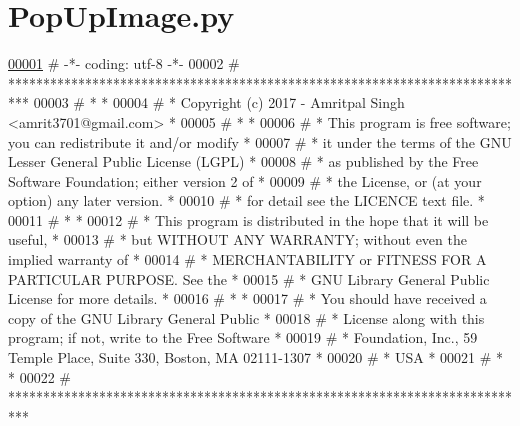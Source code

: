 \hypertarget{PopUpImage_8py_source}{}\section{Pop\+Up\+Image.\+py}

\begin{DoxyCode}
\hypertarget{PopUpImage_8py_source.tex_l00001}{}\hyperlink{namespacePopUpImage}{00001} \textcolor{comment}{# -*- coding: utf-8 -*-}
00002 \textcolor{comment}{# ***************************************************************************}
00003 \textcolor{comment}{# *                                                                         *}
00004 \textcolor{comment}{# *   Copyright (c) 2017 - Amritpal Singh <amrit3701@gmail.com>             *}
00005 \textcolor{comment}{# *                                                                         *}
00006 \textcolor{comment}{# *   This program is free software; you can redistribute it and/or modify  *}
00007 \textcolor{comment}{# *   it under the terms of the GNU Lesser General Public License (LGPL)    *}
00008 \textcolor{comment}{# *   as published by the Free Software Foundation; either version 2 of     *}
00009 \textcolor{comment}{# *   the License, or (at your option) any later version.                   *}
00010 \textcolor{comment}{# *   for detail see the LICENCE text file.                                 *}
00011 \textcolor{comment}{# *                                                                         *}
00012 \textcolor{comment}{# *   This program is distributed in the hope that it will be useful,       *}
00013 \textcolor{comment}{# *   but WITHOUT ANY WARRANTY; without even the implied warranty of        *}
00014 \textcolor{comment}{# *   MERCHANTABILITY or FITNESS FOR A PARTICULAR PURPOSE.  See the         *}
00015 \textcolor{comment}{# *   GNU Library General Public License for more details.                  *}
00016 \textcolor{comment}{# *                                                                         *}
00017 \textcolor{comment}{# *   You should have received a copy of the GNU Library General Public     *}
00018 \textcolor{comment}{# *   License along with this program; if not, write to the Free Software   *}
00019 \textcolor{comment}{# *   Foundation, Inc., 59 Temple Place, Suite 330, Boston, MA  02111-1307  *}
00020 \textcolor{comment}{# *   USA                                                                   *}
00021 \textcolor{comment}{# *                                                                         *}
00022 \textcolor{comment}{# ***************************************************************************}

\end{DoxyCode}
